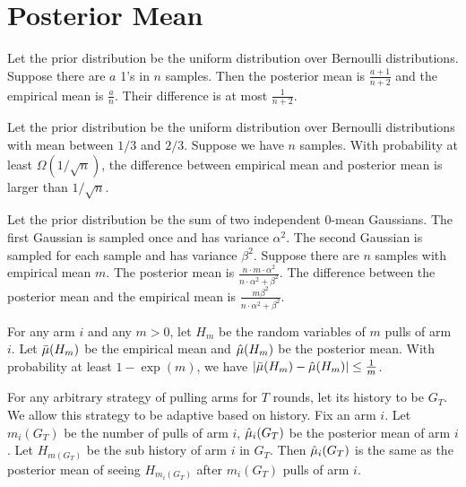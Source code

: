 \section{Posterior Mean}

\begin{example}
Let the prior distribution be the uniform distribution over Bernoulli distributions. Suppose there are $a$ 1's in $n$ samples. Then the posterior mean is $\frac{a+1}{n+2}$ and the empirical mean is $\frac{a}{n}$. Their difference is at most $\frac{1}{n+2}$. 
\end{example}

\begin{example}
Let the prior distribution be the uniform distribution over Bernoulli distributions with mean between $1/3$ and $2/3$. Suppose we have $n$ samples. With probability at least $\Omega(1/\sqrt{n})$, the difference between empirical mean and posterior mean is larger than $1/\sqrt{n}$.
\end{example}

\begin{example}
Let the prior distribution be the sum of two independent 0-mean Gaussians. The first Gaussian is sampled once and has variance $\alpha^2$. The second Gaussian is sampled for each sample and has variance $\beta^2$. Suppose there are $n$ samples with empirical mean $m$. The posterior mean is $\frac{n \cdot m \cdot \alpha^2}{n \cdot \alpha^2 + \beta^2}$. The difference between the posterior mean and the empirical mean is $\frac{m\beta^2}{n\cdot \alpha^2 + \beta^2}$.
\end{example}

\begin{assumption}
\label{ass:post}
For any arm $i$ and any $m >0$, let $H_m$ be the random variables of $m$ pulls of arm $i$. Let $\bar{\mu}(H_m)$ be the empirical mean and $\hat{\mu}(H_m)$ be the posterior mean. With probability at least $1 - \exp(m)$, we have $|\bar{\mu}(H_m) - \hat{\mu}(H_m)| \leq \frac{1}{m}$. 
\end{assumption}

\begin{lemma}
\label{lem:post}
For any arbitrary strategy of pulling arms for $T$ rounds, let its history to be $G_T$. We allow this strategy to be adaptive based on history. Fix an arm $i$. Let $m_i(G_T)$ be the number of pulls of arm $i$, $\hat{\mu}_i(G_T)$ be the posterior mean of arm $i$. Let $H_{m(G_T)}$ be the sub history of arm $i$ in $G_T$. Then $\hat{\mu}_i(G_T)$ is the same as the posterior mean of seeing $H_{m_i(G_T)}$ after $m_i(G_T)$ pulls of arm $i$.
\end{lemma}

